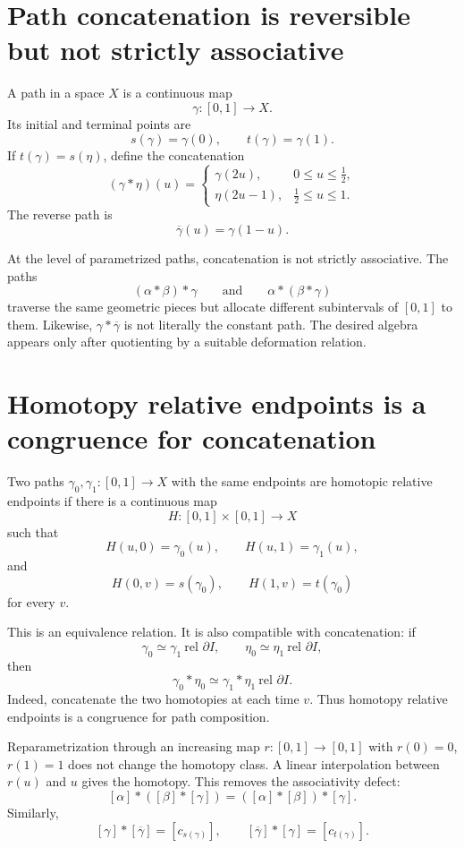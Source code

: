 
\section{Path concatenation is reversible but not strictly associative}

A path in a space \(X\) is a continuous map
\[
  \gamma:[0,1]\to X.
\]
Its initial and terminal points are
\[
  s(\gamma)=\gamma(0),
  \qquad
  t(\gamma)=\gamma(1).
\]
If \(t(\gamma)=s(\eta)\), define the concatenation
\[
  (\gamma*\eta)(u)=
  \begin{cases}
    \gamma(2u),&0\le u\le\frac12,\\
    \eta(2u-1),&\frac12\le u\le1.
  \end{cases}
\]
The reverse path is
\[
  \overline\gamma(u)=\gamma(1-u).
\]

At the level of parametrized paths, concatenation is not strictly associative.  The paths
\[
  (\alpha*\beta)*\gamma
  \qquad\text{and}\qquad
  \alpha*(\beta*\gamma)
\]
traverse the same geometric pieces but allocate different subintervals of \([0,1]\) to them.  Likewise, \(\gamma*\overline\gamma\) is not literally the constant path.  The desired algebra appears only after quotienting by a suitable deformation relation.

\section{Homotopy relative endpoints is a congruence for concatenation}

Two paths \(\gamma_0,\gamma_1:[0,1]\to X\) with the same endpoints are homotopic relative endpoints if there is a continuous map
\[
  H:[0,1]\times[0,1]\to X
\]
such that
\[
  H(u,0)=\gamma_0(u),
  \qquad
  H(u,1)=\gamma_1(u),
\]
and
\[
  H(0,v)=s(\gamma_0),
  \qquad
  H(1,v)=t(\gamma_0)
\]
for every \(v\).

This is an equivalence relation.  It is also compatible with concatenation: if
\[
  \gamma_0\simeq\gamma_1\ \text{rel }\partial I,
  \qquad
  \eta_0\simeq\eta_1\ \text{rel }\partial I,
\]
then
\[
  \gamma_0*\eta_0\simeq\gamma_1*\eta_1\ \text{rel }\partial I.
\]
Indeed, concatenate the two homotopies at each time \(v\).  Thus homotopy relative endpoints is a congruence for path composition.

Reparametrization through an increasing map \(r:[0,1]\to[0,1]\) with \(r(0)=0\), \(r(1)=1\) does not change the homotopy class.  A linear interpolation between \(r(u)\) and \(u\) gives the homotopy.  This removes the associativity defect:
\[
  [\alpha]*([\beta]*[\gamma])
  =([\alpha]*[\beta])*[\gamma].
\]
Similarly,
\[
  [\gamma]*[\overline\gamma]=[c_{s(\gamma)}],
  \qquad
  [\overline\gamma]*[\gamma]=[c_{t(\gamma)}].
\]

